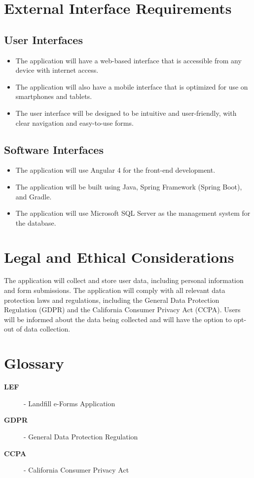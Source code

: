 \documentclass[12pt]{article}
\begin{document}
\section{External Interface Requirements}
\subsection{User Interfaces}
\begin{itemize}
     \item The application will have a web-based interface that is accessible from any device with internet access.
     \item The application will also have a mobile interface that is optimized for use on smartphones and tablets.
     \item The user interface will be designed to be intuitive and user-friendly, with clear navigation and easy-to-use forms.
\end{itemize}
\subsection{Software Interfaces}
\begin{itemize}
     \item The application will use Angular 4 for the front-end development.
     \item The application will be built using Java, Spring Framework (Spring Boot), and Gradle.
     \item The application will use Microsoft SQL Server as the management system for the database.
\end{itemize}
\newpage

\section{Legal and Ethical Considerations}
The application will collect and store user data, including personal information and form submissions. The application will comply with all relevant data protection laws and regulations, including the General Data Protection Regulation (GDPR) and the California Consumer Privacy Act (CCPA). Users will be informed about the data being collected and will have the option to opt-out of data collection.
\newpage

\section*{Glossary}
\begin{description}
    \item[\textbf{LEF}] - Landfill e-Forms Application
    \item[\textbf{GDPR}] - General Data Protection Regulation
    \item[\textbf{CCPA}] - California Consumer Privacy Act
\end{description}
\end{document}
